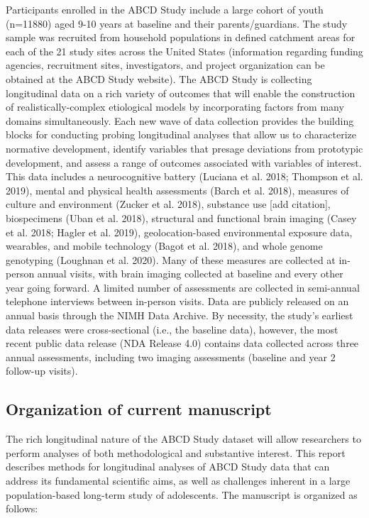 \documentclass[
  letterpaper,
  DIV=11,
  numbers=noendperiod]{scrartcl}
\begin{document}
Participants enrolled in the ABCD Study include a large cohort of youth
(n=11880) aged 9-10 years at baseline and their parents/guardians. The
study sample was recruited from household populations in defined
catchment areas for each of the 21 study sites across the United States
(information regarding funding agencies, recruitment sites,
investigators, and project organization can be obtained at the ABCD
Study website). The ABCD Study is collecting longitudinal data on a rich
variety of outcomes that will enable the construction of
realistically-complex etiological models by incorporating factors from
many domains simultaneously. Each new wave of data collection provides
the building blocks for conducting probing longitudinal analyses that
allow us to characterize normative development, identify variables that
presage deviations from prototypic development, and assess a range of
outcomes associated with variables of interest. This data includes a
neurocognitive battery (Luciana et al. 2018; Thompson et al. 2019),
mental and physical health assessments (Barch et al. 2018), measures of
culture and environment (Zucker et al. 2018), substance use {[}add
citation{]}, biospecimens (Uban et al. 2018), structural and functional
brain imaging (Casey et al. 2018; Hagler et al. 2019), geolocation-based
environmental exposure data, wearables, and mobile technology (Bagot et
al. 2018), and whole genome genotyping (Loughnan et al. 2020). Many of
these measures are collected at in-person annual visits, with brain
imaging collected at baseline and every other year going forward. A
limited number of assessments are collected in semi-annual telephone
interviews between in-person visits. Data are publicly released on an
annual basis through the NIMH Data Archive. By necessity, the study's
earliest data releases were cross-sectional (i.e., the baseline data),
however, the most recent public data release (NDA Release 4.0) contains
data collected across three annual assessments, including two imaging
assessments (baseline and year 2 follow-up visits).

\hypertarget{organization-of-current-manuscript}{%
\subsection{Organization of current
manuscript}\label{organization-of-current-manuscript}}

The rich longitudinal nature of the ABCD Study dataset will allow
researchers to perform analyses of both methodological and substantive
interest. This report describes methods for longitudinal analyses of
ABCD Study data that can address its fundamental scientific aims, as
well as challenges inherent in a large population-based long-term study
of adolescents. The manuscript is organized as follows:
\end{document}
